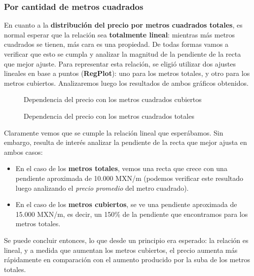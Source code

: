 \documentclass[
10pt, %
a4paper, %
oneside, %
headinclude,footinclude, %
BCOR5mm, %
]{scrartcl}
\begin{document}
    
    \subsubsection{Por cantidad de metros cuadrados}
    En cuanto a la \textbf{distribuci\'on del precio por metros cuadrados totales}, es normal esperar que la relaci\'on sea \textbf{totalmente lineal}: mientras m\'as metros cuadrados se tienen, m\'as cara es una propiedad. De todas formas vamos a verificar que esto se cumpla y analizar la magnitud de la pendiente de la recta que mejor ajuste.
    \vskip 2mm
    Para representar esta relaci\'on, se eligi\'o utilizar dos ajustes lineales en base a puntos (\textbf{RegPlot}): uno para los metros totales, y otro para los metros cubiertos. Analizaremos luego los resultados de ambos gr\'aficos obtenidos.
    
    \begin{figure}[H]
        \caption{Dependencia del precio con los metros cuadrados cubiertos}
        \label{fig:precio-distribucion-metroscubiertos}
    \end{figure}
    
    \begin{figure}[H]
        \caption{Dependencia del precio con los metros cuadrados totales}
        \label{fig:precio-distribucion-metrostotales}
    \end{figure}
    
    Claramente vemos que se cumple  la relaci\'on lineal que esperábamos. Sin embargo, resulta de inter\'es analizar la pendiente de la recta que mejor ajusta en ambos casos:
    
    \begin{itemize}
        \item En el caso de los \textbf{metros totales}, vemos una recta que crece con una pendiente aproximada de 10.000 MXN/m (podemos verificar este resultado luego analizando el \textit{precio promedio} del metro cuadrado).
        \item En el caso de los \textbf{metros cubiertos}, se ve una pendiente aproximada de 15.000 MXN/m, es decir, un 150\% de la pendiente que encontramos para los metros totales.
    \end{itemize}
    
    Se puede concluir entonces, lo que desde un principio era esperado: la relaci\'on es lineal, y a medida que aumentan los metros cubiertos, el precio aumenta m\'as r\'apidamente en comparaci\'on con el aumento producido por la suba de los metros totales.
    
\end{document}
